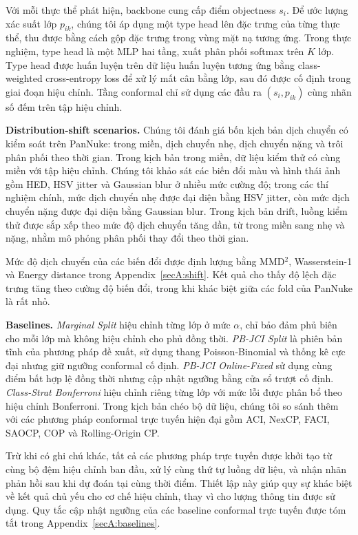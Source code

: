 \documentclass[pdflatex,sn-mathphys-num]{sn-jnl}
\begin{document}
Với mỗi thực thể phát hiện, backbone cung cấp điểm objectness \(s_i\). Để ước lượng
xác suất lớp \(p_{ik}\), chúng tôi áp dụng một type head lên đặc trưng của từng thực
thể, thu được bằng cách gộp đặc trưng trong vùng mặt nạ tương ứng. Trong thực nghiệm,
type head là một MLP hai tầng, xuất phân phối softmax trên \(K\) lớp. Type head được
huấn luyện trên dữ liệu huấn luyện tương ứng bằng class-weighted cross-entropy loss để
xử lý mất cân bằng lớp, sau đó được cố định trong giai đoạn hiệu chỉnh. Tầng conformal chỉ sử dụng các đầu ra
\((s_i,p_{ik})\) cùng nhãn số đếm trên tập hiệu chỉnh.

\textbf{Distribution-shift scenarios.}
Chúng tôi đánh giá bốn kịch bản dịch chuyển có kiểm soát trên PanNuke: trong miền,
dịch chuyển nhẹ, dịch chuyển nặng và trôi phân phối theo thời gian. Trong kịch bản
trong miền, dữ liệu kiểm thử có cùng miền với tập hiệu chỉnh. Chúng tôi khảo sát các
biến đổi màu và hình thái ảnh gồm HED, HSV jitter và Gaussian blur ở nhiều mức cường
độ; trong các thí nghiệm chính, mức dịch chuyển nhẹ được đại diện bằng HSV jitter, còn
mức dịch chuyển nặng được đại diện bằng Gaussian blur. Trong kịch bản drift, luồng kiểm
thử được sắp xếp theo mức độ dịch chuyển tăng dần, từ trong miền sang nhẹ và nặng,
nhằm mô phỏng phân phối thay đổi theo thời gian.

Mức độ dịch chuyển của các biến đổi được định lượng bằng MMD\(^2\), Wasserstein-1 và
Energy distance trong Appendix~\ref{secA:shift}. Kết quả cho thấy độ lệch đặc trưng
tăng theo cường độ biến đổi, trong khi khác biệt giữa các fold của PanNuke là rất nhỏ.


\textbf{Baselines.}
\emph{Marginal Split} hiệu chỉnh từng lớp ở mức \(\alpha\), chỉ bảo đảm phủ biên cho
mỗi lớp mà không hiệu chỉnh cho phủ đồng thời. \emph{PB-JCI Split} là phiên bản tĩnh của phương pháp đề xuất, sử
dụng thang Poisson-Binomial và thống kê cực đại nhưng giữ ngưỡng conformal cố định.
\emph{PB-JCI Online-Fixed} sử dụng cùng điểm bất hợp lệ đồng thời nhưng cập nhật ngưỡng
bằng cửa sổ trượt cố định. \emph{Class-Strat Bonferroni} hiệu chỉnh riêng từng lớp với
mức lỗi được phân bổ theo hiệu chỉnh Bonferroni. Trong kịch bản chéo bộ dữ liệu, chúng tôi so sánh
thêm với các phương pháp conformal trực tuyến hiện đại gồm ACI, NexCP, FACI, SAOCP,
COP và Rolling-Origin CP.

Trừ khi có ghi chú khác, tất cả các phương pháp trực tuyến được khởi tạo từ cùng bộ
đệm hiệu chỉnh ban đầu, xử lý cùng thứ tự luồng dữ liệu, và nhận nhãn phản hồi sau khi
dự đoán tại cùng thời điểm. Thiết lập này giúp quy sự khác biệt về kết quả chủ yếu cho
cơ chế hiệu chỉnh, thay vì cho lượng thông tin được sử dụng. Quy tắc cập nhật ngưỡng
của các baseline conformal trực tuyến được tóm tắt trong Appendix~\ref{secA:baselines}.
\end{document}
